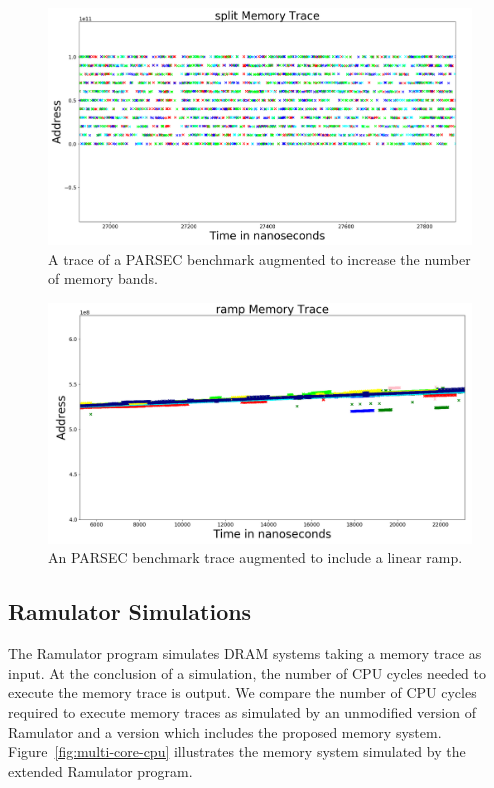 \begin{figure}[h!]
		\includegraphics[width=\linewidth]{figures/vips_split.png}
		\caption{A trace of a PARSEC benchmark augmented to increase the number of memory bands.}
		\label{fig:vips_split}
\end{figure}

\begin{figure}[h!]
		\includegraphics[width=\linewidth]{figures/vips_ramp.png}
		\caption{An PARSEC benchmark trace augmented to include a linear ramp.}
		\label{fig:vips_ramp}
\end{figure}

\subsection{Ramulator Simulations}
The Ramulator program simulates DRAM systems taking a memory trace as input. At the conclusion of a simulation, the number of CPU cycles needed to execute the memory trace is output. We compare the number of CPU cycles required to execute memory traces as simulated by an unmodified version of Ramulator and a version which includes the proposed memory system. Figure~\ref{fig:multi-core-cpu} illustrates the memory system simulated by the extended Ramulator program.

